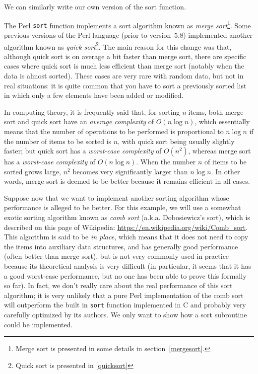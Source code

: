 We can similarly write our own version of the sort 
function. 


The Perl {\tt sort} function implements a sort 
algorithm known as \emph{merge sort}\footnote{Merge 
sort is presented in some details in 
section~\ref{mergesort}.}.  Some 
previous versions of the Perl language (prior to 
version~5.8) implemented another algorithm known 
as \emph{quick sort}\footnote{Quick sort is presented 
in \ref{quicksort}}. The main reason for this 
change was that, although quick sort is on average  
a bit faster than merge sort, there are specific 
cases where quick sort is much less efficient than 
merge sort (notably when the data is almost sorted). 
These cases are very rare with random data, but not 
in real situations: it is quite common that you have 
to sort a previously sorted list in which only a 
few elements have been added or modified.

In computing theory, it is frequently said that, for 
sorting \emph{n} items, both merge sort and quick 
sort have an \emph{average complexity} of $O(n \log n)$, 
which essentially means that the number of operations 
to be performed is proportional to $n \log n$ if 
the number of items to be sorted is $n$, 
with quick sort being usually slightly faster; but 
quick sort has a \emph{worst-case complexity} of 
$O(n^{2})$, whereas merge sort has a \emph{worst-case 
complexity} of $O(n \log n)$. When the number $n$ of 
items to be sorted grows large, $n^{2}$ becomes 
very significantly larger than $n \log n$. In other 
words, merge sort is deemed to be better because it 
remains efficient in all cases.

Suppose now that we want to implement another sorting 
algorithm whose performance is alleged to be better. 
For this example, we will use a somewhat exotic sorting 
algorithm known as \emph{comb sort} (a.k.a. Dobosiewicz's 
sort), which is described on this page of Wikipedia:
\url{https://en.wikipedia.org/wiki/Comb_sort}. This 
algorithm is said to be \emph{in place}, which means that 
it does not need to copy the items into auxiliary data 
structures, and has generally good performance (often better 
than merge sort), but is not very commonly used in 
practice because its theoretical analysis is very difficult 
(in particular, it seems that it has a good worst-case 
performance, but no one has been able to prove this 
formally so far). In fact, we don't really care about 
the real performance of this sort algorithm; it is 
very unlikely that a pure Perl implementation 
of the comb sort will outperform the built in 
{\tt sort} function implemented in C and probably very 
carefully optimized by its authors. We only want to 
show how a sort subroutine could be implemented.

